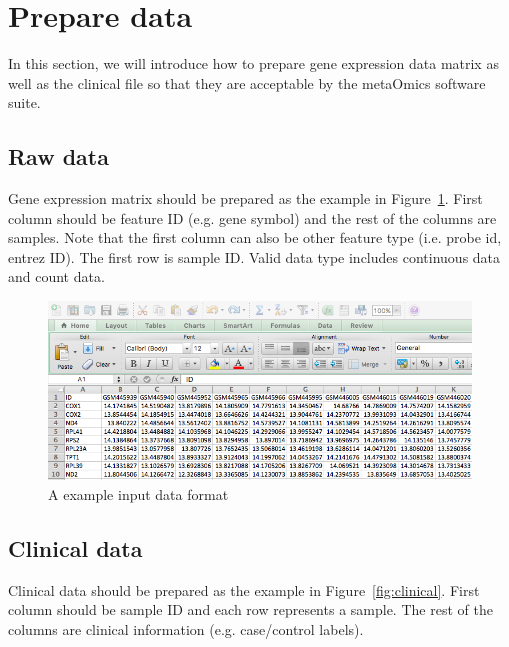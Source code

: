 
\section{Prepare data}
\label{sec:dataPrepare}
In this section, we will introduce how to prepare gene expression data matrix as well as the clinical file so that they are acceptable by the metaOmics software suite.

\subsection{Raw data}

Gene expression matrix should be prepared as the example in Figure~\ref{fig:dataMicroarray}.
First column should be feature ID (e.g. gene symbol) and the rest of the columns are samples.
Note that the first column can also be other feature type (i.e. probe id, entrez ID).
The first row is sample ID.
Valid data type includes continuous data and count data.

\begin{figure}[H]
\begin{center}
\includegraphics[scale=0.5]{./figure/dataPreparation/dataMicroarray}
\caption{A example input data format}
\label{fig:dataMicroarray}
\end{center}
\end{figure}

\subsection{Clinical data}

Clinical data should be prepared as the example in Figure~\ref{fig:clinical}.
First column should be sample ID and each row represents a sample.
The rest of the columns are clinical information (e.g. case/control labels).

